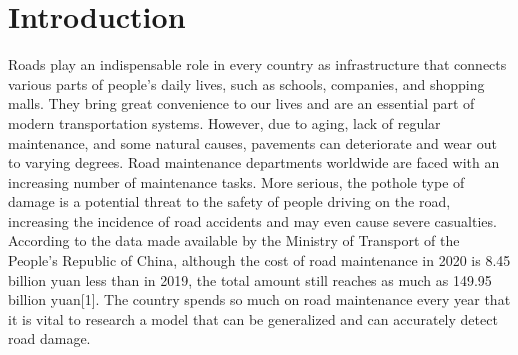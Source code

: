 \documentclass[sensors,article,submit,moreauthors]{Definitions/mdpi}
\begin{document}


    \section{Introduction}

    Roads play an indispensable role in every country as infrastructure that connects various parts of people's daily lives, such as schools, companies, and shopping malls. They bring great convenience to our lives and are an essential part of modern transportation systems. However, due to aging, lack of regular maintenance, and some natural causes, pavements can deteriorate and wear out to varying degrees. Road maintenance departments worldwide are faced with an increasing number of maintenance tasks. More serious, the pothole type of damage is a potential threat to the safety of people driving on the road, increasing the incidence of road accidents and may even cause severe casualties. According to the data made available by the Ministry of Transport of the People's Republic of China, although the cost of road maintenance in 2020 is 8.45 billion yuan less than in 2019, the total amount still reaches as much as 149.95 billion yuan[1]\citep{MOT2021}. The country spends so much on road maintenance every year that it is vital to research a model that can be generalized and can accurately detect road damage.
\end{document}
